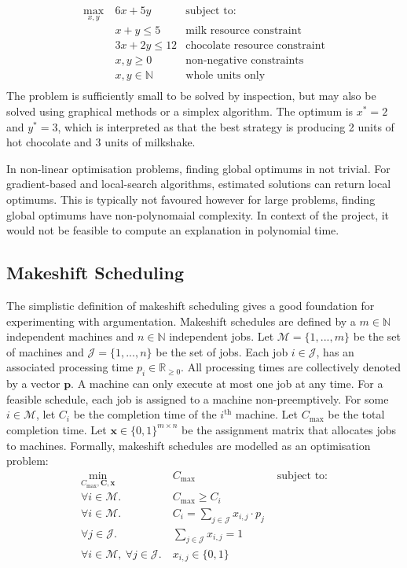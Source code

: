 \begin{align*}
	\max_{x,y}\ &6x+5y&\text{subject to:}\\
	&x+y\leq 5&\text{milk resource constraint}\\
	&3x+2y\leq 12&\text{chocolate resource constraint}\\
	&x,y\geq 0&\text{non-negative constraints}\\
	&x,y\in\mathbb{N}&\text{whole units only}\\
\end{align*}
The problem is sufficiently small to be solved by inspection, but may also be solved using graphical methods or a simplex algorithm. The optimum is $x^*=2$ and $y^*=3$, which is interpreted as that the best strategy is producing 2 units of hot chocolate and 3 units of milkshake.

In non-linear optimisation problems, finding global optimums in not trivial. For gradient-based and local-search algorithms, estimated solutions can return local optimums. This is typically not favoured however for large problems, finding global optimums have non-polynomaial complexity. In context of the project, it would not be feasible to compute an explanation in polynomial time.

\subsection{Makeshift Scheduling}

The simplistic definition of makeshift scheduling gives a good foundation for experimenting with argumentation. Makeshift schedules are defined by a $m\in\mathbb{N}$ independent machines and $n\in\mathbb{N}$ independent jobs.\cite{sa} Let $\mathcal{M}=\{1,...,m\}$ be the set of machines and $\mathcal{J}=\{1,...,n\}$ be the set of jobs. Each job $i\in\mathcal{J}$, has an associated processing time $p_i\in\mathbb{R}_{\geq 0}$. All processing times are collectively denoted by a vector $\mathbf{p}$. A machine can only execute at most one job at any time. For a feasible schedule, each job is assigned to a machine non-preemptively. For some $i\in\mathcal{M}$, let $C_i$ be the completion time of the $i^\text{th}$ machine. Let $C_{\max}$ be the total completion time. Let $\mathbf{x}\in\{0,1\}^{m\times n}$ be the assignment matrix that allocates jobs to machines. Formally, makeshift schedules are modelled as an optimisation problem:
\begin{align*}
	\min_{C_{\max},\mathbf{C},\mathbf{x}}&C_{\max}&\text{ subject to:}\\
	\forall i\in\mathcal{M}.\ &C_{\max}\geq C_i\\
	\forall i\in\mathcal{M}.\ &C_i=\sum_{j\in\mathcal{J}}x_{i,j}\cdot p_j\\
	\forall j\in\mathcal{J}.\ &\sum_{j\in\mathcal{J}}x_{i,j}=1\\
	\forall i\in\mathcal{M},\ \forall j\in\mathcal{J}.\ &x_{i,j}\in\{0,1\}
\end{align*}

